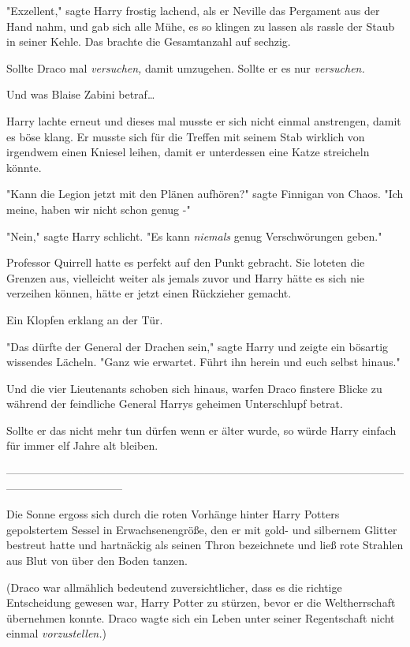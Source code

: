 {"Exzellent," sagte Harry frostig lachend, als er Neville das Pergament aus der Hand nahm, und gab sich alle Mühe, es so klingen zu lassen als rassle der Staub in seiner Kehle. Das brachte die Gesamtanzahl auf sechzig.

Sollte Draco mal \emph{versuchen,} damit umzugehen. Sollte er es nur \emph{versuchen.}

Und was Blaise Zabini betraf…

Harry lachte erneut und dieses mal musste er sich nicht einmal anstrengen, damit es böse klang. Er musste sich für die Treffen mit seinem Stab wirklich von irgendwem einen Kniesel leihen, damit er unterdessen eine Katze streicheln könnte.

"Kann die Legion jetzt mit den Plänen aufhören?" sagte Finnigan von Chaos. "Ich meine, haben wir nicht schon genug -"

"Nein," sagte Harry schlicht. "Es kann \emph{niemals} genug Verschwörungen geben."

Professor Quirrell hatte es perfekt auf den Punkt gebracht. Sie loteten die Grenzen aus, vielleicht weiter als jemals zuvor und Harry hätte es sich nie verzeihen können, hätte er jetzt einen Rückzieher gemacht.

Ein Klopfen erklang an der Tür.

"Das dürfte der General der Drachen sein," sagte Harry und zeigte ein bösartig wissendes Lächeln. "Ganz wie erwartet. Führt ihn herein und euch selbst hinaus."

Und die vier Lieutenants schoben sich hinaus, warfen Draco finstere Blicke zu während der feindliche General Harrys geheimen Unterschlupf betrat.

Sollte er das nicht mehr tun dürfen wenn er älter wurde, so würde Harry einfach für immer elf Jahre alt bleiben.

--------------------------------------------------------------------------------------------------------------------------------------------

Die Sonne ergoss sich durch die roten Vorhänge hinter Harry Potters gepolstertem Sessel in Erwachsenengröße, den er mit gold- und silbernem Glitter bestreut hatte und hartnäckig als seinen Thron bezeichnete und ließ rote Strahlen aus Blut von über den Boden tanzen.

(Draco war allmählich bedeutend zuversichtlicher, dass es die richtige Entscheidung gewesen war, Harry Potter zu stürzen, bevor er die Weltherrschaft übernehmen konnte. Draco wagte sich ein Leben unter seiner Regentschaft nicht einmal \emph{vorzustellen.})

}
